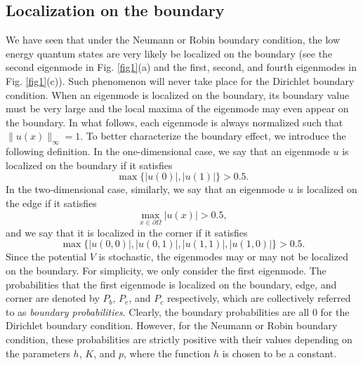 \documentclass[a4paper,11pt]{article}
\begin{document}
\subsection{Localization on the boundary}
We have seen that under the Neumann or Robin boundary condition, the low energy quantum states are very likely be localized on the boundary (see the second eigenmode in Fig. \ref{fig1}(a) and the first, second, and fourth eigenmodes in Fig. \ref{fig1}(c)). Such phenomenon will never take place for the Dirichlet boundary condition. When an eigenmode is localized on the boundary, its boundary value must be very large and the local maxima of the eigenmode may even appear on the boundary. In what follows, each eigenmode is always normalized such that $\|u(x)\|_\infty = 1$. To better characterize the boundary effect, we introduce the following definition. In the one-dimensional case, we say that an eigenmode $u$ is localized on the boundary if it satisfies
\begin{equation}\label{probbound}
\max\{|u(0)|, |u(1)|\} > 0.5.
\end{equation}
In the two-dimensional case, similarly, we say that an eigenmode $u$ is localized on the edge if it satisfies
\begin{equation}\label{probedge}
\max_{x \in \partial \Omega} |u(x)| > 0.5,
\end{equation}
and we say that it is localized in the corner if it satisfies
\begin{equation}\label{probcorner}
\max\{|u(0,0)|, |u(0,1)|, |u(1,1)|, |u(1,0)|\} > 0.5.
\end{equation}
Since the potential $V$ is stochastic, the eigenmodes may or may not be localized on the boundary. For simplicity, we only consider the first eigenmode. The probabilities that the first eigenmode is localized on the boundary, edge, and corner are denoted by $P_b$, $P_e$, and $P_c$ respectively, which are collectively referred to as \emph{boundary probabilities}. Clearly, the boundary probabilities are all $0$ for the Dirichlet boundary condition. However, for the Neumann or Robin boundary condition, these probabilities are strictly positive with their values depending on the parameters $h$, $K$, and $p$, where the function $h$ is chosen to be a constant.
\end{document}
